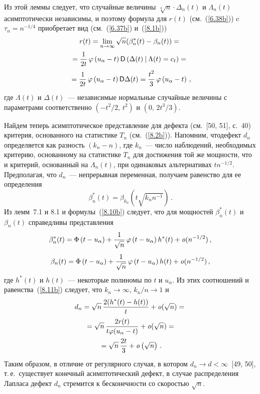 \begin{multicols}{2}
Из этой леммы следует, что случайные величины $\sqrt[4] n \cdot \Delta_n(t)$ 
и $\Lambda_n(t)$ асимптотически независимы, и поэтому
формула для $r(t)$ (см.~(\ref{6.38b})) c $\tau_n=n^{-1/4}$ приобретает
вид (см.~(\ref{6.37b}) и~(\ref{8.1b}))
\begin{multline}
r(t)=\lim_{n \to \infty}{\sqrt n(\beta_n^*(t)-\beta_n(t))}= {}\\
=\displaystyle\frac{\displaystyle 1\mathstrut}{\displaystyle 2t\mathstrut}\,\varphi\left (
u_{\alpha}-t \right ) {\sf D}\left (
\Delta(t)\:|\:\Lambda(t)=c_t\right )={}\\
{}=\displaystyle\frac{\displaystyle 1\mathstrut}{\displaystyle 2t\mathstrut}\,\varphi\left (u_{\alpha}-t\right )
{\sf D}\Delta(t)= \displaystyle\frac{\displaystyle t^2\mathstrut}{\displaystyle 3\mathstrut}\,\varphi\left (
u_{\alpha}-t\right )\,,
\label{8.10b}
\end{multline}
где $\Lambda(t)$ и $\Delta(t)$~--- независимые нормальные случайные
величины с параметрами соответственно $(-t^2/2,\,t^2)$ и
$(0,\,2t^3/3)$.

Найдем теперь асимптотическое представление для дефекта
(см.~[50, 51], с.~40) критерия, основанного на статистике $T_n$
(см.~(\ref{8.2b})). Напомним, что\linebreak дефект $d_n$ определяется как разность
$(k_n-n)$, где $k_n$~--- число наблюдений, необходимых критерию,
основанному на статистике $T_n$ для достижения той же мощности,
что и критерий, основанный на $\Lambda_n(t)$, при одинаковых
альтернативах $tn^{-1/2}$. Предполагая, что $d_n$~--- непрерывная
переменная, получаем равенство для ее определения
\begin{equation}
\beta_n^*(t)=\beta_{k_n}(t\sqrt{k_nn^{-1}})\,.
\label{8.11b}
\end{equation}
Из лемм~7.1 и 8.1 и формулы~(\ref{8.10b}) следует, что для мощностей
$\beta_n^*(t)$ и $\beta_n(t)$ справедливы представления
$$
\beta_n^*(t)=\Phi\left (
t-u_\alpha\right )+ \displaystyle\frac{\displaystyle 1\mathstrut}{\displaystyle \sqrt n\mathstrut}\,\varphi\left (
t-u_{\alpha}\right ) h^*(t)+{\it o}(n^{-1/2})\,,
$$
$$
\beta_n(t)=\Phi\left (
t-u_\alpha\right )+ \displaystyle\frac{\displaystyle 1\mathstrut}{\displaystyle \sqrt n\mathstrut}\,\varphi\left (
t-u_{\alpha}\right ) h(t)+{\it o}(n^{-1/2})\,,
$$
где $h^*(t)$ и $h(t)$~--- некоторые полиномы по $t$ и $u_{\alpha}$. Из
этих соотношений и равенства~(\ref{8.11b}) следует, что $k_n \to \infty$,
$k_n/n \to 1$ и
\begin{multline}
d_n=\sqrt{n}\,\displaystyle\frac{\displaystyle 2(h^*(t)-h(t))\mathstrut}{\displaystyle t\mathstrut}+{\it o}(\sqrt n)= {}\\
{}=\sqrt{n}\, \displaystyle\frac{\displaystyle 2r(t)\mathstrut}{\displaystyle t\varphi(u_{\alpha}-t)\mathstrut}+{\it o}(\sqrt n)= {}\\
{}= \sqrt {n}\, \displaystyle\frac{\displaystyle 2t\mathstrut}{\displaystyle 3\mathstrut}+{\it o}\left(\sqrt n\right)\,.
\label{8.12b}
\end{multline}
Таким образом, в отличие от регулярного случая, в
котором $d_n \to d<\infty$~[49, 50],
т.\,е.\ существует конечный асимптотический дефект,  в случае
распределения Лапласа дефект $d_n$ стремится к бесконечности со
скоростью $\sqrt n$.


\end{multicols}

